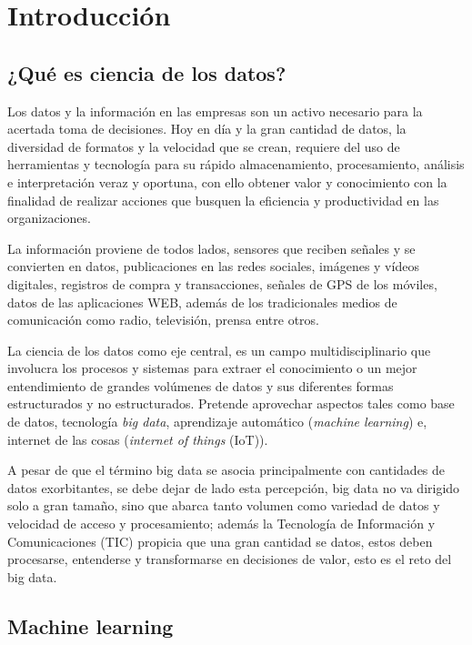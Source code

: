 \documentclass[
]{book}
\begin{document}
\hypertarget{intro}{%
\chapter{Introducción}\label{intro}}

\hypertarget{quuxe9-es-ciencia-de-los-datos}{%
\section{¿Qué es ciencia de los datos?}\label{quuxe9-es-ciencia-de-los-datos}}

Los datos y la información en las empresas son un activo necesario para la acertada toma de decisiones. Hoy en día y la gran cantidad de datos, la diversidad de formatos y la velocidad que se crean, requiere del uso de herramientas y tecnología para su rápido almacenamiento, procesamiento, análisis e interpretación veraz y oportuna, con ello obtener valor y conocimiento con la finalidad de realizar acciones que busquen la eficiencia y productividad en las organizaciones.

La información proviene de todos lados, sensores que reciben señales y se convierten en datos, publicaciones en las redes sociales, imágenes y vídeos digitales, registros de compra y transacciones, señales de GPS de los móviles, datos de las aplicaciones WEB, además de los tradicionales medios de comunicación como radio, televisión, prensa entre otros.

La ciencia de los datos como eje central, es un campo multidisciplinario que involucra los procesos y sistemas para extraer el conocimiento o un mejor entendimiento de grandes volúmenes de datos y sus diferentes formas estructurados y no estructurados. Pretende aprovechar aspectos tales como base de datos, tecnología \emph{big data}, aprendizaje automático (\emph{machine learning}) e, internet de las cosas (\emph{internet of things} (IoT)).

A pesar de que el término big data se asocia principalmente con cantidades de datos exorbitantes, se debe dejar de lado esta percepción, big data no va dirigido solo a gran tamaño, sino que abarca tanto volumen como variedad de datos y velocidad de acceso y procesamiento; además la Tecnología de Información y Comunicaciones (TIC) propicia que una gran cantidad se datos, estos deben~ procesarse, entenderse y transformarse en decisiones de valor, esto es el reto del big data.

\hypertarget{machine-learning}{%
\section{Machine learning}\label{machine-learning}}
\end{document}
